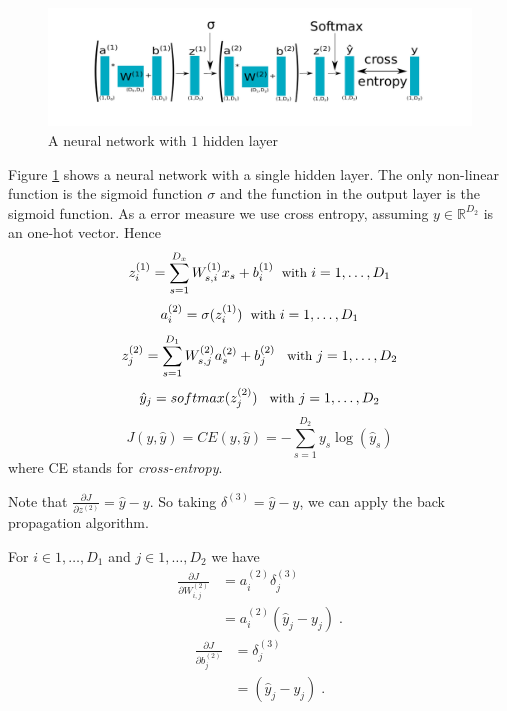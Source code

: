 \documentclass{article}
\begin{document}
\begin{figure}
\begin{center}
\includegraphics[scale=0.85]{example.pdf}
\end{center}
\caption{A neural network with $1$ hidden layer}
\label{example}
\end{figure}
Figure \ref{example} shows a neural network with a single hidden layer. The only non-linear function is the sigmoid function $\sigma$ and the function in the output layer is the sigmoid function. As a error measure we use cross entropy, assuming $y \in \mathbb{R}^{D_2}$ is an one-hot vector. Hence
\begin{equation}\label{eq:12}
z^{(1)}_i = \sum_{s=1}^{D_{x}}W^{(1)}_{s,i} x_{s} + b^{(1)}_{i}  \; {\small \text{ with }i = 1, \dots, D_{1}}
\end{equation}
\begin{equation}\label{eq:13}
a^{(2)}_i = \sigma(z^{(1)}_i )  \; {\small \text{ with }i = 1, \dots,D_{1}}
\end{equation}
\begin{equation}\label{eq:14}
z^{(2)}_j = \sum_{s=1}^{D_{1}}W^{(2)}_{s,j} a^{(2)}_{s} + b^{(2)}_{j} \;\; {\small \text{ with }j = 1, \dots, D_{2}}
\end{equation}
\begin{equation}\label{eq:15}
\hat{y}_j = softmax(z^{(2)}_j) \;\; {\small \text{ with }j = 1, \dots, D_{2}}
\end{equation}
\begin{equation}\label{eq:16}
J(y,\hat{y}) = CE(y,\hat{y}) = -\sum_{s=1}^{D_{2}} y_s  \log(\hat{y}_s)
\end{equation}
where CE stands for \textit{cross-entropy}.

Note that $\frac{\partial J}{\partial  z^{(2)}} = \hat{y} - y$. So taking $\delta^{(3)} = \hat{y} - y$, we can apply the back propagation algorithm.

For $i \in {1,\dots,D_{1}}$ and $j \in {1,\dots,D_{2}}$ we have
\begin{align*}
\frac{\partial J}{\partial W^{(2)}_{i,j}} & = a^{(2)}_{i}\delta^{(3)}_{j}\\
& = a^{(2)}_{i}(\hat{y}_{j} - y_{j})\; .
\end{align*}
\begin{align*}
\frac{\partial J}{\partial b^{(2)}_{j}} & = \delta^{(3)}_{j}\\
& = (\hat{y}_{j} - y_{j})\; .
\end{align*}
\end{document}
